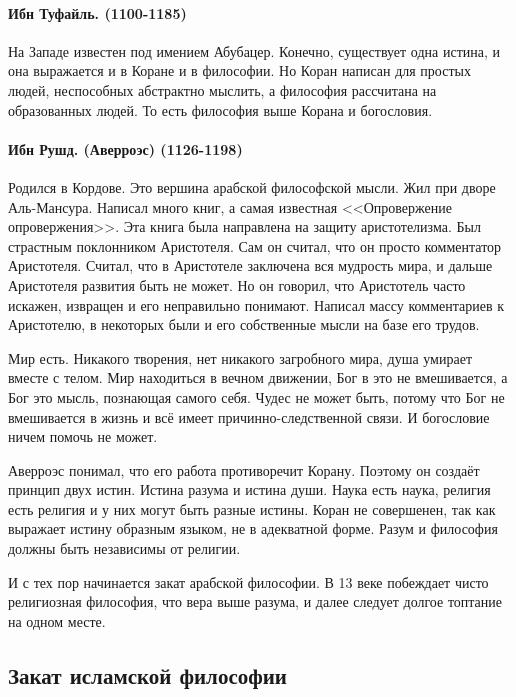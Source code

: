 \paragraph{Ибн Туфайль. (1100-1185)}

На Западе известен под имением Абубацер. Конечно, существует одна истина, и она выражается и в Коране и в философии. Но Коран написан для простых людей, неспособных абстрактно мыслить, а философия рассчитана на образованных людей. То есть философия выше Корана и богословия.

\paragraph{Ибн Рушд. (Аверроэс) (1126-1198)}

Родился в Кордове. Это вершина арабской философской мысли. Жил при дворе Аль-Мансура. Написал много книг, а самая известная <<Опровержение опровержения>>. Эта книга была направлена на защиту аристотелизма. Был страстным поклонником Аристотеля. Сам он считал, что он просто комментатор Аристотеля. Считал, что в Аристотеле заключена вся мудрость мира, и дальше Аристотеля развития быть не может. Но он говорил, что Аристотель часто искажен, извращен и его неправильно понимают. Написал массу комментариев к Аристотелю, в некоторых были и его собственные мысли на базе его трудов.

    Мир есть. Никакого творения, нет никакого загробного мира, душа умирает вместе с телом. Мир находиться в вечном движении, Бог в это не вмешивается, а Бог это мысль, познающая самого себя. Чудес не может быть, потому что Бог не вмешивается в жизнь и всё имеет причинно-следственной связи. И богословие ничем помочь не может.

Аверроэс понимал, что его работа противоречит Корану. Поэтому он создаёт принцип двух истин. Истина разума и истина души. Наука есть наука, религия есть религия и у них могут быть разные истины. Коран не совершенен, так как выражает истину образным языком, не в адекватной форме. Разум и философия должны быть независимы от религии.

И с тех пор начинается закат арабской философии. В 13 веке побеждает чисто религиозная философия, что вера выше разума, и далее следует долгое топтание на одном месте.


\subsection{Закат исламской философии}


